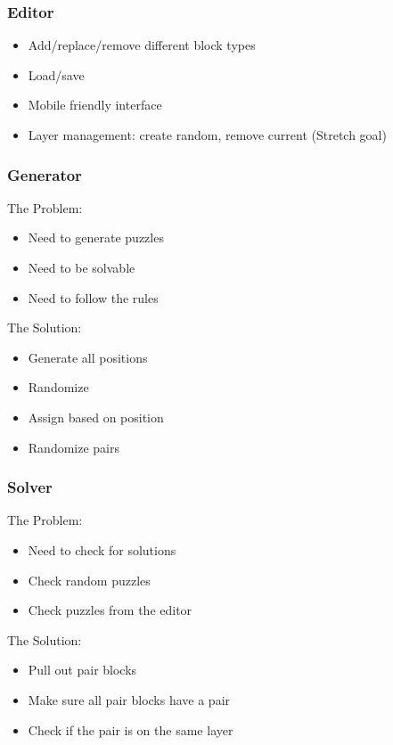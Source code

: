 \documentclass{beamer}
\begin{document}
\begin{frame}
    \frametitle{Editor} %
    \begin{itemize}
        \item Add/replace/remove different block types
        \item Load/save
        \pause \item Mobile friendly interface
        \pause \item Layer management: create random, remove current (Stretch goal)
    \end{itemize}
\end{frame}

\begin{frame}
    \frametitle{Generator} %
    The Problem:
    \begin{itemize}
	\pause \item Need to generate puzzles
	\pause \item Need to be solvable
	\pause \item Need to follow the rules
	\end{itemize}

	\pause The Solution:
	\begin{itemize}
	\pause \item Generate all positions
	\pause \item Randomize
	\pause \item Assign based on position
	\pause \item Randomize pairs
	\end{itemize}
\end{frame}

\begin{frame}
    \frametitle{Solver} %
    The Problem:
    \begin{itemize}
	\pause \item Need to check for solutions
	\pause \item Check random puzzles
	\pause \item Check puzzles from the editor
	\end{itemize}

	\pause The Solution:
	\begin{itemize}
	\pause \item Pull out pair blocks
	\pause \item Make sure all pair blocks have a pair
	\pause \item Check if the pair is on the same layer
	\end{itemize}
\end{frame}
\end{document}
